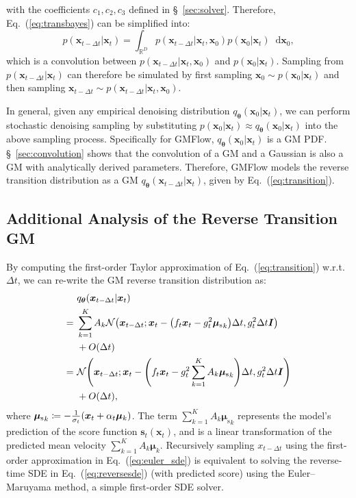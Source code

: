 \documentclass{article}
\def\vmu{{\bm{\mu}}}
\def\vtheta{{\bm{\theta}}}
\def\vs{{\bm{s}}}
\def\vx{{\bm{x}}}
\def\mI{{\bm{I}}}
\newcommand{\R}{\mathbb{R}}
\theoremstyle{custom}
\theoremstyle{definition}
\theoremstyle{remark}
\let\originalleft\left
\let\originalright\right
\renewcommand{\left}{\mathopen{}\mathclose\bgroup\originalleft}
\renewcommand{\right}{\aftergroup\egroup\originalright}
\newcommand{\diff}{\mathop{}\!\mathrm{d}}
\begin{document}
with the coefficients $c_1, c_2, c_3$ defined in \S~\ref{sec:solver}. Therefore, Eq.~(\ref{eq:transbayes}) can be simplified into:
\begin{equation}
    p(\vx_{t - \Delta t}|\vx_t) = \int_{\R^D} p(\vx_{t - \Delta t}|\vx_t, \vx_0) p(\vx_0|\vx_t) \diff \vx_0,
\end{equation}
which is a convolution between $p(\vx_{t - \Delta t}|\vx_t, \vx_0)$ and $p(\vx_0|\vx_t)$. Sampling from $p(\vx_{t - \Delta t}|\vx_t)$ can therefore be simulated by first sampling $\vx_0 \sim p(\vx_0|\vx_t)$ and then sampling $\vx_{t - \Delta t} \sim p(\vx_{t - \Delta t}|\vx_t, \vx_0)$.

In general, given any empirical denoising distribution $q_\vtheta(\vx_0|\vx_t)$, we can perform stochastic denoising sampling by substituting $p(\vx_0|\vx_t) \approx q_\vtheta(\vx_0|\vx_t)$ into the above sampling process. Specifically for GMFlow, $q_\vtheta(\vx_0|\vx_t)$ is a GM PDF. \S~\ref{sec:convolution} shows that the convolution of a GM and a Gaussian is also a GM with analytically derived parameters. Therefore, GMFlow models the reverse transition distribution as a GM $q_\vtheta(\vx_{t - \Delta t}|\vx_t)$, given by Eq.~(\ref{eq:transition}).

\subsection{Additional Analysis of the Reverse Transition GM}
\label{sec:trans_approx}
By computing the first-order Taylor approximation of Eq.~(\ref{eq:transition}) w.r.t. $\Delta t$, we can re-write the GM reverse transition distribution as:
\begin{align}
    &\ q_\vtheta(\vx_{t-\Delta t}|\vx_t) \notag\\
    =&\ \sum_{k=1}^K A_k \mathcal{N}\left(\vx_{t - \Delta t}; \vx_t - \left( f_t \vx_t - g_t^2 {\vmu_\text{s}}_k \right) \Delta t, g_t^2 \Delta t \mI \right) \notag\\
    &\ + O(\Delta t) \notag\\
    =&\ \mathcal{N}\left(\vx_{t - \Delta t}; \vx_t - \left( f_t \vx_t - g_t^2 \sum_{k=1}^K A_k {\vmu_\text{s}}_k \right) \Delta t, g_t^2 \Delta t \mI \right) \notag\\
    &\ + O(\Delta t),
    \label{eq:euler_sde}
\end{align}
where ${\vmu_\text{s}}_k \coloneqq - \frac{1}{\sigma_t}\left( \vx_t + \alpha_t \vmu_k \right)$. The term $\sum_{k=1}^K A_k {\vmu_\text{s}}_k$ represents the model's prediction of the score function $\vs_t(\vx_t)$, and is a linear transformation of the predicted mean velocity $\sum_{k=1}^K A_k \vmu_k$. Recursively sampling $x_{t-\Delta t}$ using the first-order approximation in Eq.~(\ref{eq:euler_sde}) is equivalent to solving the reverse-time SDE in Eq.~(\ref{eq:reversesde}) (with predicted score) using the Euler--Maruyama method, a simple first-order SDE solver. 
\end{document}
